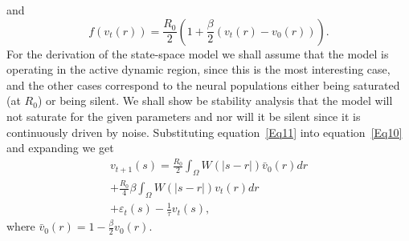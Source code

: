 \documentclass[journal]{IEEEtran}
\begin{document}
and
\begin{equation}\label{Eq12}
f\left( {{v_t}\left( r \right)} \right) = \frac{{{R_0}}}{2}\left( {1 + \frac{\beta }{2}\left( {{v_t}\left( r \right) - {v_0}\left( r \right)} \right)} \right).
\end{equation}
For the derivation of the state-space model we shall assume that the model is operating in the active dynamic region, since this is the most interesting case, and the other cases correspond to the neural populations either being saturated (at $R_0$) or being silent. We shall show be stability analysis that the model will not saturate for the given parameters and nor will it be silent since it is continuously driven by noise. Substituting equation~\ref{Eq11} into equation~\ref{Eq10} and expanding we get
\begin{align}\label{Eq13}
 {v_{t + 1}}\left( s \right) = \frac{{{R_0}}}{2}\int_\Omega  {W\left( {\left| {s - r} \right|} \right){{\bar v}_0}\left( r \right)dr}  \nonumber \\
  + \frac{{{R_0}}}{4}\beta \int_\Omega  {W\left( {\left| {s - r} \right|} \right){v_t}\left( r \right)dr}  \\
  + {\varepsilon _t}\left( s \right) - \frac{1}{\tau }{v_t}\left( s \right), \nonumber
\end{align}
where ${\bar v_0}\left( r \right) = 1 - \frac{\beta }{2}{v_0}\left( r \right)$.
\end{document}
